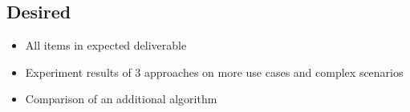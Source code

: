 \documentclass[rnd]{mas_proposal}
\begin{document}
\subsection{Desired}
\begin{itemize}
    \item All items in expected deliverable
    \item Experiment results of 3 approaches on more use cases and complex scenarios
    \item Comparison of an additional algorithm
\end{itemize}


\end{document}

